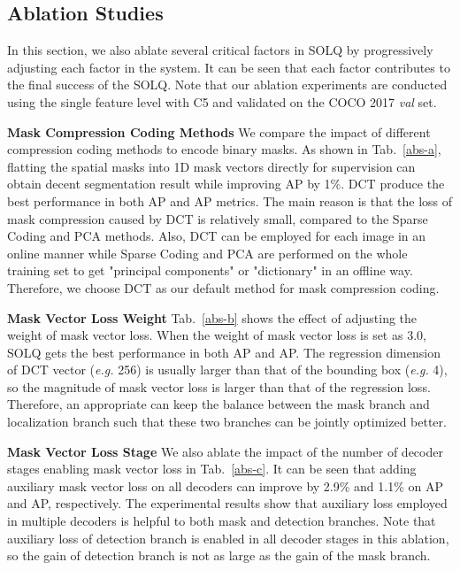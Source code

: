 \documentclass{article}
\begin{document}
\subsection{Ablation Studies}
\label{ablation_studies}
In this section, we also ablate several critical factors in SOLQ by progressively adjusting each factor in the system. It can be seen that each factor contributes to the final success of the SOLQ. 
Note that our ablation experiments are conducted using the single feature level with C5 and validated on the COCO 2017 \textit{val} set.

\textbf{Mask Compression Coding Methods}
We compare the impact of different compression coding methods to encode binary masks. As shown in Tab.~\ref{abs-a}, flatting the spatial masks into 1D mask vectors directly for supervision can obtain decent segmentation result while improving AP by 1\%. DCT produce the best performance in both AP and AP metrics. The main reason is that the loss of mask compression caused by DCT is relatively small, compared to the Sparse Coding and PCA methods. Also, DCT can be employed for each image in an online manner while Sparse Coding and PCA are performed on the whole training set to get "principal components" or "dictionary" in an offline way. Therefore, we choose DCT as our default method for mask compression coding.

\textbf{Mask Vector Loss Weight}
Tab.~\ref{abs-b} shows the effect of adjusting the weight of mask vector loss. When the weight of mask vector loss  is set as 3.0, SOLQ gets the best performance in both AP and AP. The regression dimension of DCT vector (\textit{e.g.} 256) is usually larger than that of the bounding box (\textit{e.g.} 4), so the magnitude of mask vector loss is larger than that of the regression loss. Therefore, an appropriate  can keep the balance between the mask branch and localization branch such that these two branches can be jointly optimized better.

\textbf{Mask Vector Loss Stage}
We also ablate the impact of the number of decoder stages enabling mask vector loss in Tab.~\ref{abs-c}. It can be seen that adding auxiliary mask vector loss on all decoders can improve by 2.9\% and 1.1\% on AP and AP, respectively. The experimental results show that auxiliary loss employed in multiple decoders is helpful to both mask and detection branches. Note that auxiliary loss of detection branch is enabled in all decoder stages in this ablation, so the gain of detection branch is not as large as the gain of the mask branch.
\end{document}
